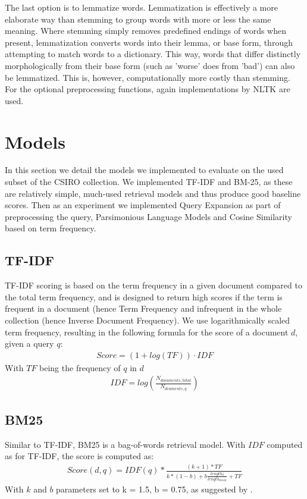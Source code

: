 \documentclass{article}
\begin{document}
The last option is to lemmatize words. Lemmatization is effectively a more elaborate way than stemming to group words with more or less the same meaning. Where stemming simply removes predefined endings of words when present, lemmatization converts words into their lemma, or base form, through attempting to match words to a dictionary. This way, words that differ distinctly morphologically from their base form (such as 'worse' does from 'bad') can also be lemmatized. This is, however, computationally more costly than stemming. For the optional preprocessing functions, again implementations by NLTK are used.

\section*{Models}
In this section we detail the models we implemented to evaluate on the used subset of the CSIRO collection. We implemented TF-IDF and BM-25, as these are relatively simple, much-used retrieval models and thus produce good baseline scores. Then as an experiment we implemented Query Expansion as part of preprocessing the query, Parsimonious Language Models and Cosine Similarity based on term frequency.
\subsection*{TF-IDF}
TF-IDF scoring is based on the term frequency in a given document compared to the total term frequency, and is designed to return high scores if the term is frequent in a document (hence Term Frequency and infrequent in the whole collection (hence Inverse Document Frequency). We use logarithmically scaled term frequency, resulting in the following formula for the score of a document $d$, given a query $q$:
\begin{align*}
Score = (1+log(TF))\cdot IDF
\end{align*}
With $TF$ being the frequency of $q$ in $d$
\begin{align*}
IDF = log(\frac{N_{documents, total}}{N_{dcuments, q}})
\end{align*}
\subsection*{BM25}
Similar to TF-IDF, BM25 is a bag-of-words retrieval model. With $IDF$ computed as for TF-IDF, the score is computed as:
\begin{align*}
Score(d,q) = IDF(q) * \frac{(k+1)*TF}{k*(1-b)+b\frac{length_d}{length_{mean}}+TF}
\end{align*}
With $k$ and $b$ parameters set to k = 1.5, b = 0.75, as suggested by \cite{robertson1995okapi}.
\end{document}

